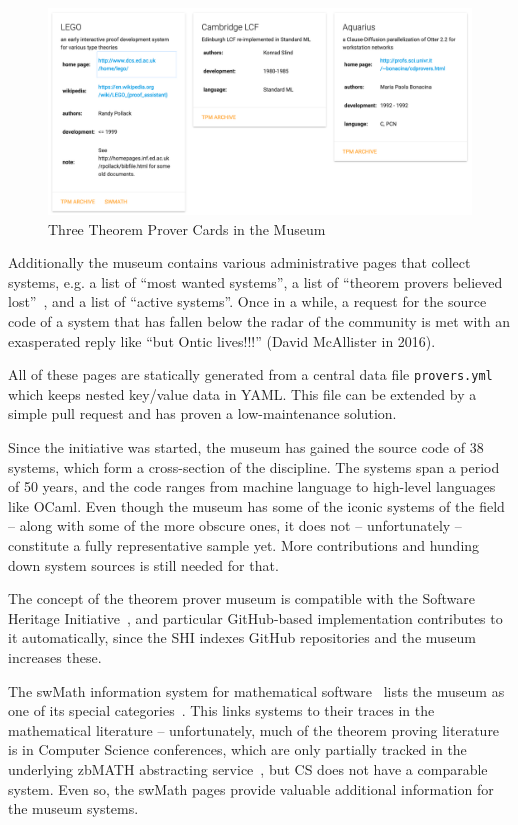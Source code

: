 \documentclass[smallcondensed]{svjour3}
\begin{document}
\begin{figure}[ht]\centering
  \includegraphics[width=\textwidth]{cards}
  \caption{Three Theorem Prover Cards in the Museum}\label{fig:cards}
\end{figure}

Additionally the museum contains various administrative pages that collect systems, e.g. a
list of ``most wanted systems'', a list of ``theorem provers believed
lost''~\cite{tpmuseum:tpbl:on}, and a list of ``active systems''. Once in a while, a
request for the source code of a system that has fallen below the radar of the community
is met with an exasperated reply like ``but Ontic lives!!!'' (David McAllister in
2016).

All of these pages are statically generated from a central data
file \texttt{provers.yml} \cite{tpmuseum:data:on} which keeps nested key/value data in
YAML. This file can be extended by a simple pull request and has proven a low-maintenance
solution. 
    
Since the initiative was started, the museum has gained the source code of 38 systems,
which form a cross-section of the discipline. The systems span a period of 50 years, and
the code ranges from machine language to high-level languages like OCaml. Even though the
museum has some of the iconic systems of the field -- along with some of the more obscure
ones, it does not -- unfortunately -- constitute a fully representative sample yet. More
contributions and hunding down system sources is still needed for that.

The concept of the theorem prover museum is compatible with the Software Heritage
Initiative~\cite{SoftwareHeritage:on}, and particular GitHub-based implementation
contributes to it automatically, since the SHI indexes GitHub repositories and the museum
increases these.

The \textsf{swMath} information system for mathematical software~\cite{swMath:on} lists
the museum as one of its special categories~\cite{swMath:tpmuseum:on}. This links systems
to their traces in the mathematical literature -- unfortunately, much of the theorem
proving literature is in Computer Science conferences, which are only partially tracked in
the underlying \textsf{zbMATH} abstracting service~\cite{zbMATH:on}, but CS does not have
a comparable system. Even so, the \textsf{swMath} pages provide valuable additional
information for the museum systems. 
\end{document}
